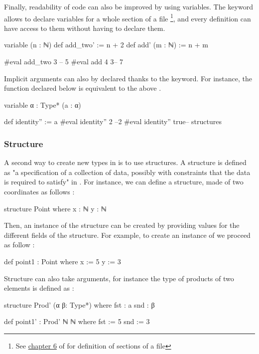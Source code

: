 Finally, readability of \Lean code can also be improved by using variables. The  keyword allows to declare variables for a whole section of a file \footnote{See \href{https://leanprover.github.io/theorem_proving_in_lean4/interacting_with_lean.html#more-on-sections}{chapter 6} of \cite{TIL} for definition of sections of a \Lean file}, and every definition can have access to them without having to declare them.
\begin{leancode}
variable (n : ℕ)
def add_two' := n + 2
def add' (m : ℕ) := n + m

#eval add_two 3 -- 5
#eval add 4 3-- 7
\end{leancode}

Implicit arguments can also by declared thanks to the  keyword. For instance, the  function declared below is  equivalent to the above .

\begin{leancode}
variable {α : Type*} (a : α)

def identity'' := a
#eval identity'' 2 --2
#eval identity'' true-- structures
\end{leancode}

\subsubsection{Structure}

A second way to create new types in \Lean is to use structures. A structure is defined as "a specification of a collection of data, possibly with constraints that the data is required to satisfy" in \cite{MIL}. For instance, we can define a  structure, made of two coordinates as follows :
\begin{leancode}
structure Point where
  x : ℕ
  y : ℕ
\end{leancode}

Then, an instance of the structure can be created by providing values for the different fields of the structure. For example, to create an instance  of  we proceed as follow :
\begin{leancode}
def point1 : Point where
  x := 5
  y := 3
\end{leancode}

Structure can also take arguments, for instance the type  of products of two elements is defined as :
\begin{leancode}
structure Prod' (α β: Type*) where
  fst : a
  snd : β

def point1' : Prod' ℕ ℕ where
  fst := 5
  snd := 3
\end{leancode}

